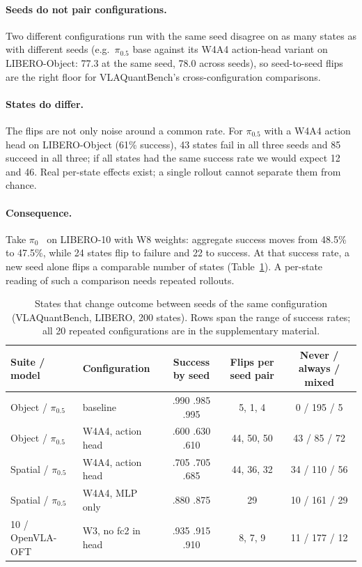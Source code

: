 \documentclass{article}
\newcommand{\pizero}{$\pi_0$\xspace}
\newcommand{\pizerofive}{$\pi_{0.5}$\xspace}
\begin{document}
\paragraph{Seeds do not pair configurations.} Two different configurations run with the same seed
disagree on as many states as with different seeds (e.g.\ \pizerofive base against its W4A4
action-head variant on LIBERO-Object: 77.3 at the same seed, 78.0 across seeds), so seed-to-seed
flips are the right floor for VLAQuantBench's cross-configuration comparisons.

\paragraph{States do differ.} The flips are not only noise around a common rate. For \pizerofive
with a W4A4 action head on LIBERO-Object (61\% success), 43 states fail in all three seeds and 85
succeed in all three; if all states had the same success rate we would expect 12 and 46. Real
per-state effects exist; a single rollout cannot separate them from chance.

\paragraph{Consequence.} Take \pizero~\citep{black2024pi0} on LIBERO-10 with W8 weights: aggregate
success moves from 48.5\% to 47.5\%, while 24 states flip to failure and 22 to success. At that
success rate, a new seed alone flips a comparable number of states (Table~\ref{tab:floor}). A
per-state reading of such a comparison needs repeated rollouts.

\begin{table}[t]
  \centering
  \small
  \caption{States that change outcome between seeds of the same configuration (VLAQuantBench,
  LIBERO, 200 states). Rows span the range of success rates; all 20 repeated configurations are
  in the supplementary material.}
  \label{tab:floor}
  \setlength{\tabcolsep}{4pt}
  \begin{tabular}{llccc}
    \toprule
    Suite / model & Configuration & Success by seed & Flips per seed pair & Never / always / mixed \\
    \midrule
    Object / \pizerofive & baseline & .990 .985 .995 & 5, 1, 4 & 0 / 195 / 5 \\
    Object / \pizerofive & W4A4, action head & .600 .630 .610 & 44, 50, 50 & 43 / 85 / 72 \\
    Spatial / \pizerofive & W4A4, action head & .705 .705 .685 & 44, 36, 32 & 34 / 110 / 56 \\
    Spatial / \pizerofive & W4A4, MLP only & .880 .875 & 29 & 10 / 161 / 29 \\
    10 / OpenVLA-OFT & W3, no fc2 in head & .935 .915 .910 & 8, 7, 9 & 11 / 177 / 12 \\
    \bottomrule
  \end{tabular}
\end{table}
\end{document}
